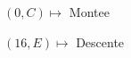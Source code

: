 \documentclass[preview]{standalone}
\begin{document}
\begin{center}
$(0,C) \mapsto$ Montee

$(16,E) \mapsto$ Descente
\end{center}
\end{document}
